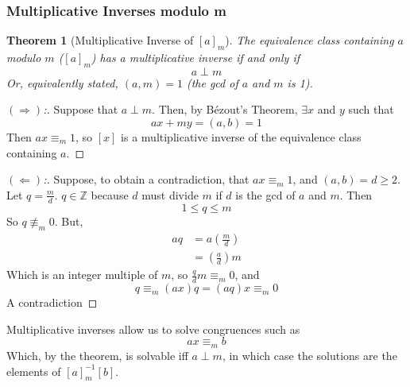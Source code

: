 \documentclass[10pt]{article}
\newcommand\ZZ{{\mathbb Z}}
\newtheorem{theorem}{Theorem}[section]
\theoremstyle{definition}
\begin{document}
\subsubsection{Multiplicative Inverses modulo m}
\begin{theorem}[Multiplicative Inverse of \textnormal{$[a]_m$}]
The equivalence class containing $a$ modulo $m$ \textnormal{($[a]_m$)} has a multiplicative inverse if and only if 
\[a\perp m\]
Or, equivalently stated, $(a,m)=1$ (the gcd of $a$ and $m$ is 1).  
\end{theorem}
\begin{proof}[$(\Rightarrow)$:]
Suppose that $a\perp m$.  Then, by B\'{e}zout's Theorem, $\exists x$ and $y$ such that
\[ax + my = (a,b)= 1\]
Then $ax\equiv_m 1$, so $[x]$ is a multiplicative inverse of the equivalence class containing $a$.  
\end{proof}
\begin{proof}[$(\Leftarrow)$:]
Suppose, to obtain a contradiction, that $ax\equiv_m 1$, and $(a,b) = d\geq 2$.  Let $q=\frac{m}{d}$.  $q\in\ZZ$ because $d$ must divide $m$ if $d$ is the gcd of $a$ and $m$.  Then 
\[1\leq q \leq m\]  So $q\not\equiv_m 0$.  But, 
\begin{align*}
aq &= a\left(\frac{m}{d}\right)\\
&= \left(\frac{a}{d}\right)m
\end{align*}
Which is an integer multiple of $m$, so $\frac{q}{d}m \equiv_m 0$, and 
\[q\equiv_m (ax)q = (aq)x \equiv_m 0\] 
A contradiction
\end{proof}
\noindent Multiplicative inverses allow us to solve congruences such as  
\[ ax \equiv_m b \]
Which, by the theorem, is solvable iff $a\perp m$, in which case the solutions are the elements of $[a]_m^{-1}[b]$.  
\end{document}
